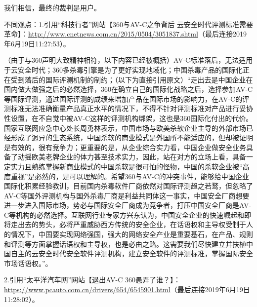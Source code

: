 \documentclass{book}
\begin{document}
我们相信，最终的裁判是用户。 \par 不同观点：1.引用“科技行者”网站【360与AV-C之争背后 云安全时代评测标准需要革命】：\url{http://www.cnetnews.com.cn/2015/0504/3051837.shtml}（最后连接2019年6月19日11:27:53）。 \par （由于与360声明大致精神相符，以下内容已经被概括）AV-C标准落后，无法适用于云安全时代；360多杀毒引擎是为了更好实现地域化；中国杀毒产品的国际化正在受到落后的国际评测机制的制约；（以下为直接引用原文）“走出去是中国企业在国内做大做强之后的必然选择，360在确立自己的国际化战略之后，选择参加AV-C等国际评测，通过国际评测的成绩来增加产品在国际市场的影响力，在AV-C的评测标准无法准确衡量产品真正水平的情况下，不得不针对评测标准对产品进行妥协性设置，在不自觉中被AV-C这样的评测机构绑架，这也是360国际化付出的代价。国家互联网应急中心处长周勇林表示，中国市场与欧美杀软企业主导的外部市场已经形成了迥异的生态系统，中国杀软的商业模式是外国所不能适应的，但却被证明是有效的，很有竞争力；更重要的是，从企业综合实力看，中国企业做安全业务具备了动摇欧美老牌企业的体力甚至技术实力，因此，站在对方的立场上看，具备一定实力且熟练掌握新商业模式的中国杀软是很可怕的怪物，中国的杀软企业被“高度重视”是必然的，是可以理解的。希望360与AV-C的冲突事件，能够给中国企业国际化积累经验教训，目前国内杀毒软件厂商依然对国际评测趋之若鹜，但忽略了AV-C等国外评测机构与国外杀毒厂商是利益共同体这一事实，中国安全厂商想要进一步进入国际市场，势必与国际安全厂商成为竞争者，打压中国安全厂商是AV-C等机构的必然选择。互联网行业专家方兴东认为，中国安全企业的快速崛起和即将走出去的势头，必将严重威胁西方传统的安全企业，在话语权和主导权受制于人的情况下，中国要实现网络强国，强大的网络安全产业是重要基石，在产品、规则和评测等方面掌握话语权和主导权，也是必由之路。这需要我们尽快建立并扶植中国自主的云安全时代安全软件评测机构，建立安全软件的评测标准，掌握国际安全市场话语权。”。 \par 2.引用“太平洋汽车网”网站【退出AV-C 360愚弄了谁？】：\url{https://www.pcauto.com.cn/drivers/654/6545901.html}（最后连接2019年6月19日11:28:02）。\par 
\end{document}
